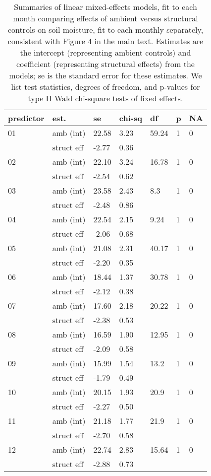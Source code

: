 \documentclass{article}
\begin{document}
\begin{table}[ht]
\centering
\caption{Summaries of linear mixed-effects models, fit to each month comparing effects of ambient versus structural controls on soil moisture, fit to each monthly separately, consistent with Figure 4 in the main text. Estimates are the intercept (representing ambient controls) and coefficient (representing structural effects) from the models; se is the standard error for these estimates. We list test statistics, degrees of freedom, and p-values for type II Wald chi-square tests of fixed effects.} 
\label{table:shamamb_soilmoism}
\begin{tabular}{|p{}|p{}|p{}p{}p{}p{}p{}|}
  \hline
predictor & est. & se & chi-sq & df & p & NA \\ 
  \hline
01 & amb (int) & 22.58 & 3.23 & 59.24 & 1 & 0 \\ 
    & struct eff & -2.77 & 0.36 &  &  &  \\ 
  02 & amb (int) & 22.10 & 3.24 & 16.78 & 1 & 0 \\ 
    & struct eff & -2.54 & 0.62 &  &  &  \\ 
  03 & amb (int) & 23.58 & 2.43 & 8.3 & 1 & 0 \\ 
    & struct eff & -2.48 & 0.86 &  &  &  \\ 
  04 & amb (int) & 22.54 & 2.15 & 9.24 & 1 & 0 \\ 
    & struct eff & -2.06 & 0.68 &  &  &  \\ 
  05 & amb (int) & 21.08 & 2.31 & 40.17 & 1 & 0 \\ 
    & struct eff & -2.20 & 0.35 &  &  &  \\ 
  06 & amb (int) & 18.44 & 1.37 & 30.78 & 1 & 0 \\ 
    & struct eff & -2.12 & 0.38 &  &  &  \\ 
  07 & amb (int) & 17.60 & 2.18 & 20.22 & 1 & 0 \\ 
    & struct eff & -2.38 & 0.53 &  &  &  \\ 
  08 & amb (int) & 16.59 & 1.90 & 12.95 & 1 & 0 \\ 
    & struct eff & -2.09 & 0.58 &  &  &  \\ 
  09 & amb (int) & 15.99 & 1.54 & 13.2 & 1 & 0 \\ 
    & struct eff & -1.79 & 0.49 &  &  &  \\ 
  10 & amb (int) & 20.15 & 1.93 & 20.9 & 1 & 0 \\ 
    & struct eff & -2.27 & 0.50 &  &  &  \\ 
  11 & amb (int) & 21.18 & 1.77 & 21.9 & 1 & 0 \\ 
    & struct eff & -2.70 & 0.58 &  &  &  \\ 
  12 & amb (int) & 22.74 & 2.83 & 15.64 & 1 & 0 \\ 
    & struct eff & -2.88 & 0.73 &  &  &  \\ 
   \hline
\end{tabular}
\end{table}\clearpage
\end{document}
